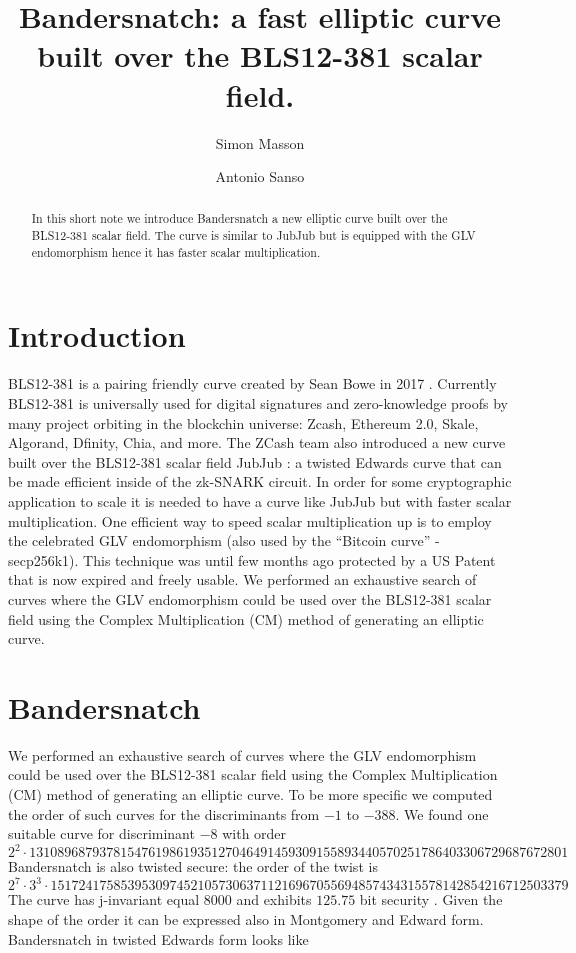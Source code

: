 \documentclass{amsart}
\begin{document}
\title[Bandersnatch]{Bandersnatch: a fast elliptic curve built over the BLS12-381 scalar field.}
\author{Simon Masson}
\address{Heliax}
\author{Antonio Sanso}
\address{Ethereum Foundation and Ruhr Universit{\"a}t Bochum}


\maketitle
\medskip
\begin{abstract}
 In this short note we  introduce Bandersnatch a new elliptic curve built over the BLS12-381 \cite{bls12381} scalar field. The curve is similar to JubJub \cite{jubjub} but is equipped with the GLV endomorphism \cite{10.1007/3-540-44647-8_11} hence it has faster scalar multiplication.
 \end{abstract}

\section{Introduction} 
BLS12-381 is a pairing friendly curve created by Sean Bowe in 2017 \cite{bls12381}. Currently BLS12-381 is universally used for digital signatures and zero-knowledge proofs by many project orbiting in the 
blockchin universe: Zcash, Ethereum 2.0, Skale, Algorand, Dfinity, Chia, and more. The ZCash team also introduced a new curve built over the BLS12-381 scalar field JubJub  \cite{jubjub}: a twisted Edwards curve that can be made efficient inside of the zk-SNARK circuit.
In order for some cryptographic application to scale it is needed to have a curve like JubJub but with faster scalar multiplication. One efficient way to speed scalar multiplication up is to employ the celebrated GLV endomorphism \cite{10.1007/3-540-44647-8_11} (also used by the “Bitcoin curve” - secp256k1). This technique was until few months ago protected by a US Patent that is now expired and freely usable.
We performed an exhaustive search of curves where the GLV endomorphism could be used over the BLS12-381 scalar field using the Complex Multiplication (CM) method of generating an elliptic curve. 

\section{Bandersnatch} 

We performed an exhaustive search of curves where the GLV endomorphism could be used over the BLS12-381 scalar field using the Complex Multiplication (CM) method of generating an elliptic curve. To be more specific we computed the order of such curves for the discriminants from $-1$ to $-388$.
We found one suitable curve for discriminant $-8$ with order 
$$2^2\cdot 13108968793781547619861935127046491459309155893440570251786403306729687672801$$
Bandersnatch is also twisted secure: the order of the twist is $$2^7 \cdot 3^3 \cdot 15172417585395309745210573063711216967055694857434315578142854216712503379$$
The curve has j-invariant equal $8000$ and exhibits $125.75$ bit security  . Given the shape of the order it can be expressed also in Montgomery and Edward form. 
Bandersnatch in twisted Edwards form looks like
\end{document}
